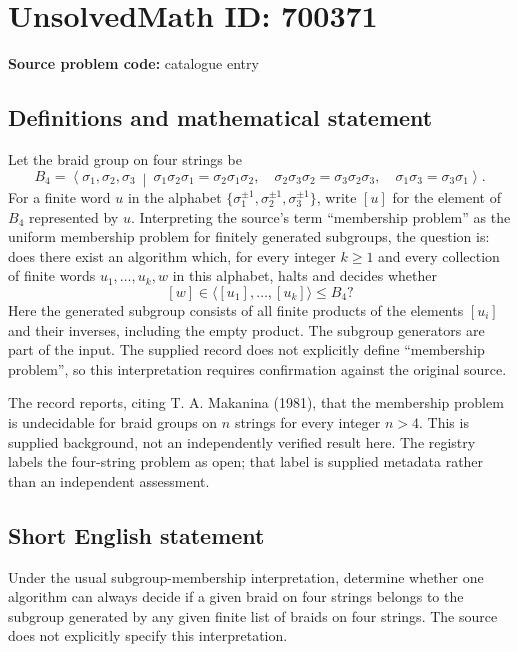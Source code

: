\documentclass[11pt]{article}
\begin{document}
\section*{UnsolvedMath ID: 700371}
\textbf{Source problem code:} catalogue entry
\subsection{Definitions and mathematical statement}
Let the braid group on four strings be
\[
B_4=\left\langle \sigma_1,\sigma_2,\sigma_3\ \middle|\ \sigma_1\sigma_2\sigma_1=\sigma_2\sigma_1\sigma_2,\quad \sigma_2\sigma_3\sigma_2=\sigma_3\sigma_2\sigma_3,\quad \sigma_1\sigma_3=\sigma_3\sigma_1\right\rangle.
\]
For a finite word \(u\) in the alphabet \(\{\sigma_1^{\pm1},\sigma_2^{\pm1},\sigma_3^{\pm1}\}\), write \([u]\) for the element of \(B_4\) represented by \(u\). Interpreting the source's term ``membership problem'' as the uniform membership problem for finitely generated subgroups, the question is: does there exist an algorithm which, for every integer \(k\geq 1\) and every collection of finite words \(u_1,\ldots,u_k,w\) in this alphabet, halts and decides whether
\[
[w]\in\langle [u_1],\ldots,[u_k]\rangle\leq B_4?
\]
Here the generated subgroup consists of all finite products of the elements \([u_i]\) and their inverses, including the empty product. The subgroup generators are part of the input. The supplied record does not explicitly define ``membership problem'', so this interpretation requires confirmation against the original source.

The record reports, citing T. A. Makanina (1981), that the membership problem is undecidable for braid groups on \(n\) strings for every integer \(n>4\). This is supplied background, not an independently verified result here. The registry labels the four-string problem as open; that label is supplied metadata rather than an independent assessment.
\subsection{Short English statement}
Under the usual subgroup-membership interpretation, determine whether one algorithm can always decide if a given braid on four strings belongs to the subgroup generated by any given finite list of braids on four strings. The source does not explicitly specify this interpretation.
\end{document}
